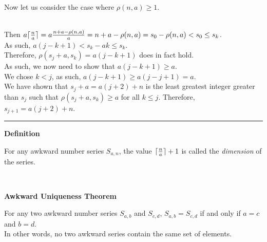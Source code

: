 \documentclass[a4paper,12pt]{article}
\DeclarePairedDelimiter{\ceil}{\lceil}{\rceil}
\begin{document}
\noindent Now let us consider the case where $\rho(n, a) \geq 1$.\\\

\noindent Then $a \ceil{\frac{n}{a}} = a \frac{n + a - \rho(n, a)}{a} = n + a - \rho(n, a) = s_0 - \rho(n, a) < s_0 \leq s_k$.\\

\noindent As such, $a(j - k + 1) < s_k - ak \leq s_k$.\\

\noindent Therefore, $\rho(s_j + a, s_k) = a(j - k + 1)$ does in fact hold.\\

\noindent As such, we now need to show that $a(j - k + 1) \geq a$.\\

\noindent We chose $k < j$, as such, $a(j - k + 1) \geq a(j - j + 1) = a$.\\

\noindent We have shown that $s_j + a = a(j + 2) + n$ is the least greatest integer greater than $s_j$ such that $\rho(s_j + a, s_k) \geq a$ for all $k \leq j$. Therefore, $s_{j+1} = a(j + 2) + n$.

\begin{center}
\noindent\rule{8cm}{0.4pt}
\end{center}





\label{definition:awkward_number_series}
\hypertarget{definition:awkward_number_series}{}
\begin{tcolorbox}
\textbf{Definition}

For any awkward number series $S_{a,n}$, the value $\ceil{\frac{n}{a}} + 1$ is called the \textit{dimension} of the series.

\end{tcolorbox}
\noindent \\







\label{theorem:awkward_uniqueness}
\hypertarget{theorem:awkward_uniqueness}{}
\begin{tcolorbox}
\textbf{Awkward Uniqueness Theorem}

\noindent For any two awkward number series $S_{a,b}$ and $S_{c,d}$, $S_{a,b} = S_{c,d}$ if and only if $a = c$ and $b = d$.\\

\noindent In other words, no two awkward series contain the same set of elements.
\end{tcolorbox}
\end{document}

